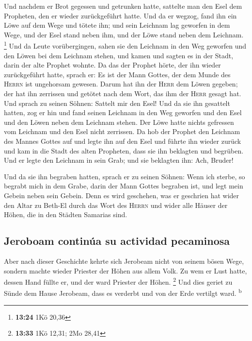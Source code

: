  Und nachdem er Brot gegessen und getrunken hatte,
sattelte man den Esel dem Propheten, den er wieder zurückgeführt hatte.
 Und da er wegzog, fand ihn ein Löwe auf dem Wege und
tötete ihn; und sein Leichnam lag geworfen in dem Wege, und der Esel
stand neben ihm, und der Löwe stand neben dem Leichnam. \footnote{\textbf{13:24}
  1Kö 20,36}  Und da Leute vorübergingen, sahen sie den
Leichnam in den Weg geworfen und den Löwen bei dem Leichnam stehen, und
kamen und sagten es in der Stadt, darin der alte Prophet wohnte.
 Da das der Prophet hörte, der ihn wieder zurückgeführt
hatte, sprach er: Es ist der Mann Gottes, der dem Munde des
\textsc{Herrn} ist ungehorsam gewesen. Darum hat ihn der \textsc{Herr}
dem Löwen gegeben; der hat ihn zerrissen und getötet nach dem Wort, das
ihm der \textsc{Herr} gesagt hat.  Und sprach zu seinen
Söhnen: Sattelt mir den Esel! Und da sie ihn gesattelt hatten,
 zog er hin und fand seinen Leichnam in den Weg geworfen
und den Esel und den Löwen neben dem Leichnam stehen. Der Löwe hatte
nichts gefressen vom Leichnam und den Esel nicht zerrissen.
 Da hob der Prophet den Leichnam des Mannes Gottes auf
und legte ihn auf den Esel und führte ihn wieder zurück und kam in die
Stadt des alten Propheten, dass sie ihn beklagten und begrüben.
 Und er legte den Leichnam in sein Grab; und sie
beklagten ihn: Ach, Bruder!

 Und da sie ihn begraben hatten, sprach er zu seinen
Söhnen: Wenn ich sterbe, so begrabt mich in dem Grabe, darin der Mann
Gottes begraben ist, und legt mein Gebein neben sein Gebein.
 Denn es wird geschehen, was er geschrien hat wider den
Altar zu Beth-El durch das Wort des \textsc{Herrn} und wider alle Häuser
der Höhen, die in den Städten Samarias sind.

\hypertarget{jeroboam-continuxfaa-su-actividad-pecaminosa}{%
\subsection{Jeroboam continúa su actividad
pecaminosa}\label{jeroboam-continuxfaa-su-actividad-pecaminosa}}

 Aber nach dieser Geschichte kehrte sich Jerobeam nicht
von seinem bösen Wege, sondern machte wieder Priester der Höhen aus
allem Volk. Zu wem er Lust hatte, dessen Hand füllte er, und der ward
Priester der Höhen. \footnote{\textbf{13:33} 1Kö 12,31; 2Mo 28,41}
 Und dies geriet zu Sünde dem Hause Jerobeam, dass es
verderbt und von der Erde vertilgt ward. \textsuperscript{b}

